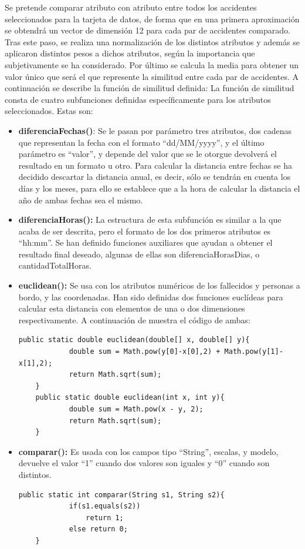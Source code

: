 \documentclass[a4paper,10pt]{article}
\begin{document}
\singlespacing
Se pretende comparar atributo con atributo entre todos los accidentes seleccionados para la tarjeta de datos, de forma que en una primera aproximaci\'on se obtendr\'a un vector de dimensi\'on 12 para cada par de accidentes comparado.
\singlespacing
Tras este paso, se realiza una normalizaci\'on de los distintos atributos y adem\'as se aplicaron distintos pesos a dichos atributos, seg\'un la importancia que subjetivamente se ha considerado.
\singlespacing
Por \'ultimo se calcula la media para obtener un valor \'unico que ser\'a el que represente la similitud  entre cada par de accidentes.
\singlespacing
A continuaci\'on se describe la funci\'on de similitud definida:
\singlespacing
La funci\'on de similitud consta de cuatro subfunciones definidas espec\'ificamente para los atributos seleccionados. Estas son:
\begin{itemize}
\item \textbf{diferenciaFechas()}: Se le pasan por par\'ametro tres atributos, dos cadenas que representan la fecha con el formato ``dd/MM/yyyy'', y el \'ultimo par\'ametro es ``valor'', y depende del valor que se le otorgue devolver\'a el resultado en un formato u otro. Para calcular la distancia entre fechas se ha decidido descartar la distancia anual, es decir, s\'olo se tendr\'an en cuenta los d\'ias y los meses, para ello se establece que a la hora de calcular la distancia el a\~no de ambas fechas sea el mismo.

\item \textbf{diferenciaHoras():} La estructura de esta subfunci\'on es similar a la que acaba de ser descrita, pero el formato de los dos primeros atributos es ``hh:mm''. Se han definido funciones auxiliares que ayudan a obtener el resultado final deseado, algunas de ellas son diferenciaHorasDias,  o cantidadTotalHoras.

\item \textbf{euclidean():} Se usa con los atributos num\'ericos de los fallecidos y personas a bordo, y las coordenadas. Han sido definidas dos funciones eucl\'ideas para calcular esta distancia con elementos de una o dos dimensiones respectivamente. A continuaci\'on de muestra el c\'odigo de ambas:
\begin{lstlisting}[style=C]
public static double euclidean(double[] x, double[] y){
	        double sum = Math.pow(y[0]-x[0],2) + Math.pow(y[1]-x[1],2);
	        return Math.sqrt(sum);
	}
	public static double euclidean(int x, int y){
	        double sum = Math.pow(x - y, 2);
	        return Math.sqrt(sum);
	}

\end{lstlisting}
\item \textbf{comparar():} Es usada con los campos tipo ``String'', escalas, y modelo, devuelve el valor ``1'' cuando dos valores son iguales y ``0'' cuando son distintos.

\begin{lstlisting}[style=C]
	public static int comparar(String s1, String s2){
			if(s1.equals(s2))
				return 1;
			else return 0;
	}
    \end{lstlisting}
\end{itemize}
\end{document}
